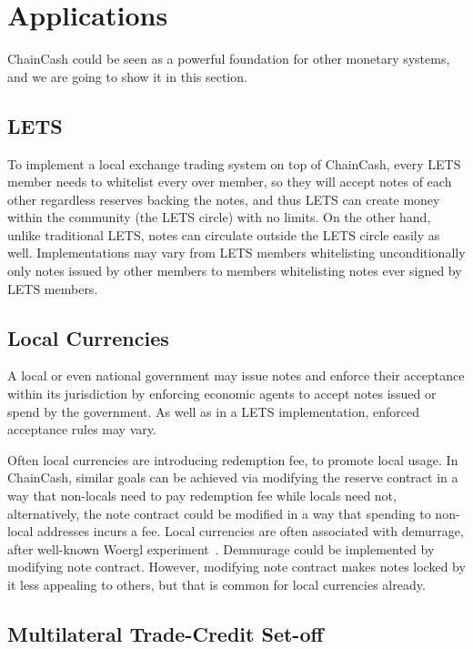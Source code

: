 \documentclass{llncs}   %
\newcommand{\cc}{ChainCash}
\begin{document}
\section{Applications}
\label{sec-apps}

\cc{} could be seen as a powerful foundation for other monetary systems, and we are going to show it in this section. 

\subsection{LETS}

To implement a local exchange trading system on top of \cc{}, every LETS member needs to whitelist every over member, so they will accept notes of each other regardless reserves backing the notes, and thus LETS can create money within the community (the LETS circle) with no limits. On the other hand, unlike traditional LETS, notes can circulate outside the LETS circle easily as well. Implementations may vary from LETS members whitelisting unconditionally only notes issued by other members to members whitelisting notes ever signed by LETS members. 


\subsection{Local Currencies}

A local or even national government may issue notes and enforce their acceptance within its jurisdiction by enforcing economic agents to accept notes issued or spend by the government. As well as in a LETS implementation, enforced acceptance rules may vary. 

Often local currencies are introducing redemption fee, to promote local usage. In \cc{}, similar goals can be achieved via modifying the reserve contract in a way that non-locals need to pay redemption fee while locals need not, alternatively, the note contract could be modified in a way that spending to non-local addresses incurs a fee. Local currencies are often associated with demurrage, after well-known Woergl experiment~\cite{unterguggenbercer1934end}. Demmurage could be implemented by modifying note contract. However, modifying note contract makes notes locked by it less appealing to others, but that is common for local currencies already.

\subsection{Multilateral Trade-Credit Set-off}
\end{document}

